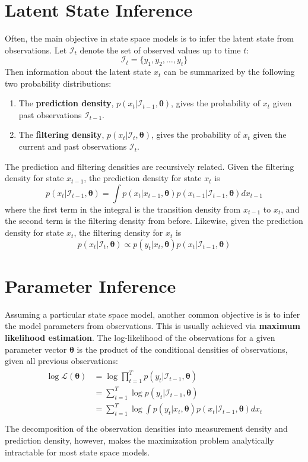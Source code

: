 \documentclass[11pt, oneside]{scrreprt}   	%
\begin{document}
\section{Latent State Inference}
Often, the main objective in state space models is to infer the latent state from observations. Let $\mathcal{I}_t$ denote the set of observed values up to time $t$:
$$
\mathcal{I}_t = \{y_1, y_2, \ldots, y_t\}
$$ 
Then information about the latent state $x_t$ can be summarized by the following two probability distributions:
\begin{enumerate}
	\item The \textbf{prediction density}, $p(x_{t} | \mathcal{I}_{t-1}, \boldsymbol{\theta})$, gives the probability of $x_t$ given past observations  $\mathcal{I}_{t-1}$.
	\item The \textbf{filtering density}, $p(x_{t} | \mathcal{I}_{t}, \boldsymbol{\theta})$, gives the probability of $x_t$ given the current and past observations  $\mathcal{I}_{t}$.
\end{enumerate}	
The prediction and filtering densities are recursively related. Given the filtering density for state $x_{t-1}$, the prediction density for state $x_t$ is
$$
p(x_{t} | \mathcal{I}_{t-1}, \boldsymbol{\theta}) = \int p(x_t | x_{t-1}, \boldsymbol{\theta}) p(x_{t-1} | \mathcal{I}_{t-1}, \boldsymbol{\theta}) dx_{t-1}
$$
where the first term in the integral is the transition density from $x_{t-1}$ to $x_t$, and the second term is the filtering density from before. Likewise, given the prediction density for state $x_t$, the filtering density for $x_t$ is
$$
p(x_{t} | \mathcal{I}_{t}, \boldsymbol{\theta}) \propto p(y_t | x_{t}, \boldsymbol{\theta}) p(x_{t} | \mathcal{I}_{t-1}, \boldsymbol{\theta}) 
$$

\section{Parameter Inference}
Assuming a particular state space model, another common objective is is to infer the model parameters from observations. This is usually achieved via \textbf{maximum likelihood estimation}. The log-likelihood of the observations for a given parameter vector $\boldsymbol{\theta}$ is the product of the conditional densities of observations, given all previous observations:
\begin{align} 
\begin{split}
\log \mathcal{L}(\boldsymbol{\theta}) &= \log \prod_{t=1}^T p(y_t | \mathcal{I}_{t-1}, \boldsymbol{\theta})\\
&= \sum_{t=1}^T \log  p(y_t | \mathcal{I}_{t-1}, \boldsymbol{\theta})\\
&= \sum_{t=1}^T \log  \int p(y_t | x_{t}, \boldsymbol{\theta}) p(x_{t} | \mathcal{I}_{t-1}, \boldsymbol{\theta}) d x_t\\
\end{split}					
\end{align} 
The decomposition of the observation densities into measurement density and prediction density, however, makes the maximization problem analytically intractable for most state space models.
\end{document}
